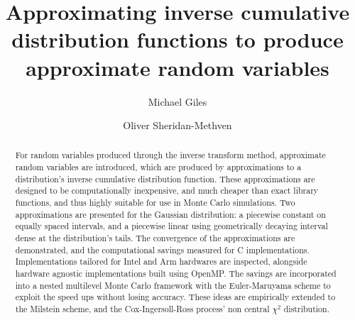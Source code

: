 \documentclass[manuscript,review]{acmart}
\title{Approximating inverse cumulative distribution functions to produce approximate random variables}
\author{Michael Giles}
\author{Oliver Sheridan-Methven}
\affiliation{%
\institution{Mathematical Institute, Oxford University}
\city{Oxford}
\country{UK}}
\begin{document}
\begin{abstract}
For random variables produced through the inverse transform method, approximate random variables are introduced, which are produced by approximations to a distribution's inverse cumulative distribution function. These approximations are designed to be computationally inexpensive, and much cheaper than exact library functions, and thus highly suitable for use in Monte Carlo simulations. Two approximations are presented for the Gaussian distribution: a piecewise constant on equally spaced intervals, and a piecewise linear using geometrically decaying interval dense at the distribution's tails. The convergence of the approximations are demonstrated, and the computational savings measured for C implementations. Implementations tailored for Intel and Arm hardwares are inspected, alongside hardware agnostic implementations built using OpenMP. The savings are incorporated into a nested multilevel Monte Carlo framework with the Euler-Maruyama scheme to exploit the speed ups without losing accuracy. These ideas are empirically extended to the Milstein scheme, and the Cox-Ingersoll-Ross process' non central $ \chi^2 $ distribution. 
\end{abstract}
\end{document}
